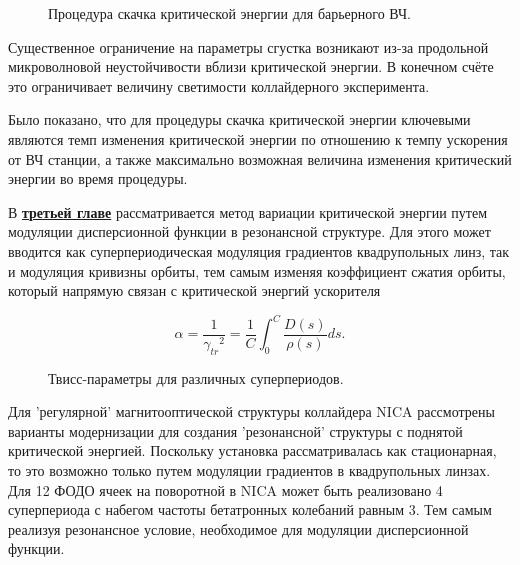 \begin{figure}[h]
    \caption{Процедура скачка критической энергии для барьерного ВЧ.}\label{fig:latex}
\end{figure}

\par Существенное ограничение на параметры сгустка возникают из-за продольной микроволновой неустойчивости вблизи критической энергии. В конечном счёте это ограничивает величину светимости коллайдерного эксперимента.

\par Было показано, что для процедуры скачка критической энергии ключевыми являются темп изменения критической энергии по отношению к темпу ускорения от ВЧ станции, а также максимально возможная величина изменения критический энергии во время процедуры.

В \underline{\textbf{третьей главе}} рассматривается метод вариации критической энергии путем модуляции дисперсионной функции в резонансной структуре. Для этого может вводится как суперпериодическая модуляция градиентов квадрупольных линз, так и модуляция кривизны орбиты, тем самым изменяя коэффициент сжатия орбиты, который напрямую связан с критической энергий ускорителя

\[
\alpha=\frac{1}{{\gamma_{tr}}^2}=\frac{1}{C}\int_{0}^{C}\frac{D\left(s\right)}{\rho\left(s\right)}ds.
\label{eq:alpha}
\]

\begin{figure}[ht]
    \caption{Твисс-параметры для различных суперпериодов.}\label{fig:latex}
\end{figure}

\par Для 'регулярной' магнитооптической структуры коллайдера NICA рассмотрены варианты модернизации для создания 'резонансной' структуры с поднятой критической энергией. Поскольку установка рассматривалась как стационарная, то это возможно только путем модуляции градиентов в квадрупольных линзах. Для 12 ФОДО ячеек на поворотной в NICA может быть реализовано 4 суперпериода с набегом частоты бетатронных колебаний равным 3. Тем самым реализуя резонансное условие, необходимое для модуляции дисперсионной функции.


